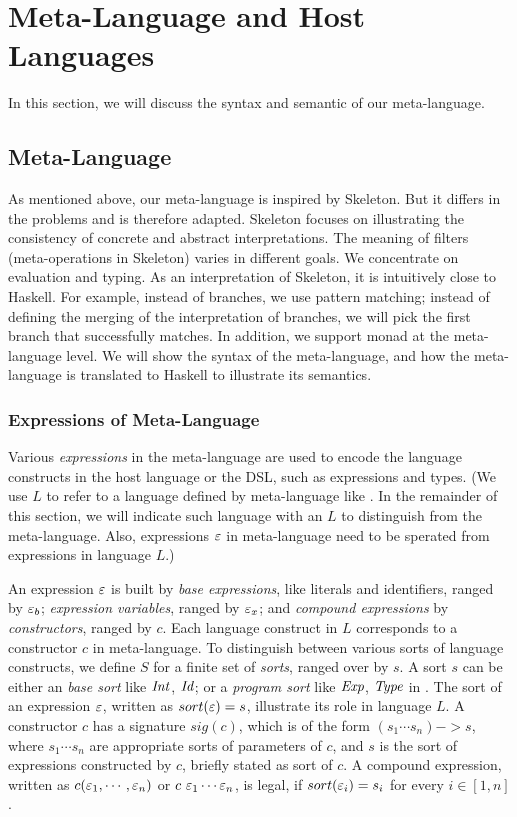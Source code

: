 \section{Meta-Language and Host Languages}


In this section, we will discuss the syntax and semantic of our meta-language.

\subsection{Meta-Language}

As mentioned above, our meta-language is inspired by Skeleton.
But it differs in the problems and is therefore adapted.
Skeleton focuses on illustrating the consistency of concrete and abstract interpretations.
The meaning of filters (meta-operations in Skeleton) varies in different goals.
We concentrate on evaluation and typing.
As an interpretation of Skeleton, it is intuitively close to Haskell.
For example, instead of branches, we use pattern matching;
 instead of defining the merging of the interpretation of branches,
 we will pick the first branch that successfully matches.
In addition, we support monad at the meta-language level.
We will show the syntax of the meta-language, 
 and how the meta-language is translated to Haskell to illustrate its semantics.

\subsubsection{Expressions of Meta-Language}
Various \textit{expressions} in the meta-language are used to encode the language constructs in the host language or the DSL, such as expressions and types.
(We use $L$ to refer to a language defined by meta-language like \STLC.
In the remainder of this section, we will indicate such language with an $L$ to distinguish from the meta-language.
Also, expressions $\varepsilon$ in meta-language need to be sperated from expressions in language $L$.)

An expression $\varepsilon$ is built by \textit{base expressions}, like literals and identifiers, ranged by $\varepsilon_b$;
 \textit{expression variables}, ranged by $\varepsilon_x$;
 and \textit{compound expressions} by \textit{constructors}, ranged by $c$.
Each language construct in $L$ corresponds to a constructor $c$ in meta-language.
To distinguish between various sorts of language constructs,
 we define $S$ for a finite set of \textit{sorts}, ranged over by $s$.
A sort $s$ can be either an \textit{base sort} like $\mathit{Int}$, $\mathit{Id}$;
 or a \textit{program sort} like $\mathit{Exp}$, $\mathit{Type}$ in \STLC.
The sort of an expression $\varepsilon$, written as $sort(\varepsilon)=s$,
 illustrate its role in language $L$.
A constructor $c$ has a signature $sig(c)$, which is of the form $(s_1\cdots s_n)->s$,
 where $s_1\cdots s_n$ are appropriate sorts of parameters of $c$,
 and $s$ is the sort of expressions constructed by $c$, briefly stated as sort of $c$.
A compound expression, written as $c(\varepsilon_1,\cdots,\varepsilon_n)$ or $c~\varepsilon_1\cdots\varepsilon_n$,
 is legal, if $sort(\varepsilon_i)=s_i$ for every $i\in [1,n]$.

